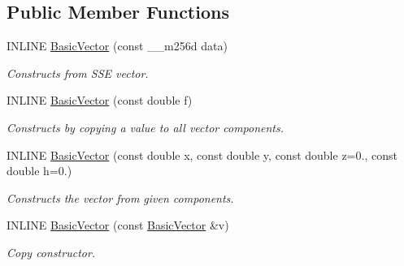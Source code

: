 \subsection*{Public Member Functions}
\begin{DoxyCompactItemize}
\item 
\hypertarget{classBasicVector_3_01double_01_4_a889c95ee2545471163f55487b033de91}{}\label{classBasicVector_3_01double_01_4_a889c95ee2545471163f55487b033de91} 
I\+N\+L\+I\+NE \hyperlink{classBasicVector_3_01double_01_4_a889c95ee2545471163f55487b033de91}{Basic\+Vector} (const \+\_\+\+\_\+m256d data)
\begin{DoxyCompactList}\small\item\em Constructs from S\+SE vector. \end{DoxyCompactList}\item 
\hypertarget{classBasicVector_3_01double_01_4_a4986ebfd741106b6321a8b94fd06f250}{}\label{classBasicVector_3_01double_01_4_a4986ebfd741106b6321a8b94fd06f250} 
I\+N\+L\+I\+NE \hyperlink{classBasicVector_3_01double_01_4_a4986ebfd741106b6321a8b94fd06f250}{Basic\+Vector} (const double f)
\begin{DoxyCompactList}\small\item\em Constructs by copying a value to all vector components. \end{DoxyCompactList}\item 
\hypertarget{classBasicVector_3_01double_01_4_a342f3502c1fa844d0a652fbe32cda072}{}\label{classBasicVector_3_01double_01_4_a342f3502c1fa844d0a652fbe32cda072} 
I\+N\+L\+I\+NE \hyperlink{classBasicVector_3_01double_01_4_a342f3502c1fa844d0a652fbe32cda072}{Basic\+Vector} (const double x, const double y, const double z=0., const double h=0.)
\begin{DoxyCompactList}\small\item\em Constructs the vector from given components. \end{DoxyCompactList}\item 
\hypertarget{classBasicVector_3_01double_01_4_a0f92a97b290b5fa81170e2989aa6ac97}{}\label{classBasicVector_3_01double_01_4_a0f92a97b290b5fa81170e2989aa6ac97} 
I\+N\+L\+I\+NE \hyperlink{classBasicVector_3_01double_01_4_a0f92a97b290b5fa81170e2989aa6ac97}{Basic\+Vector} (const \hyperlink{classBasicVector}{Basic\+Vector} \&v)
\begin{DoxyCompactList}\small\item\em Copy constructor. \end{DoxyCompactList}\item 

\end{DoxyCompactItemize}
